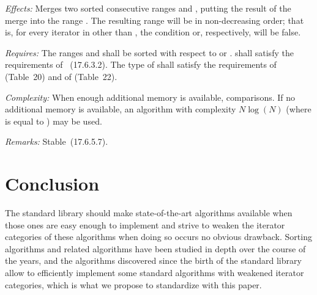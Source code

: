 \documentclass{isocpp_proposal}
\begin{document}
\begin{itemdescr}
\pnum
\emph{Effects:} Merges two sorted consecutive ranges \tcode{[first, middle)} and \tcode{[middle, last)}, putting the result of the merge into the range \tcode{[first, last)}. The resulting range will be in non-decreasing order; that is, for every iterator  in \tcode{[first, last)} other than , the condition  or, respectively,  will be false.

\pnum
\emph{Requires:} The ranges \tcode{[first, middle)} and \tcode{[middle, last)} shall be sorted with respect to  or .   shall satisfy the requirements of ~(17.6.3.2). The type of  shall satisfy the requirements of  (Table~20) and of  (Table~22).

\pnum
\emph{Complexity:} When enough additional memory is available,  comparisons. If no additional memory is available, an algorithm with complexity $N \log{} (N)$ (where  is equal to ) may be used.

\pnum
\emph{Remarks:} Stable~(17.6.5.7).
\end{itemdescr}

\section{Conclusion}

The standard library should make state-of-the-art algorithms available when those ones are easy enough to implement and strive to weaken the iterator categories of these algorithms when doing so occurs no obvious drawback. Sorting algorithms and related algorithms have been studied in depth over the course of the years, and the algorithms discovered since the birth of the standard library allow to efficiently implement some standard algorithms with weakened iterator categories, which is what we propose to standardize with this paper.



\end{document}
